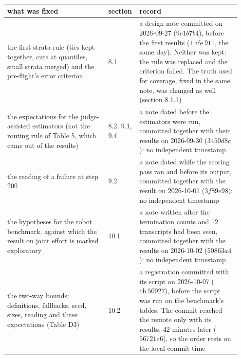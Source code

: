 \documentclass[11pt]{article}
\begin{document}
\begingroup\footnotesize\setlength{\tabcolsep}{4pt}
\begin{longtable}{@{}>{\raggedright\arraybackslash}p{0.428\linewidth}>{\raggedright\arraybackslash}p{0.091\linewidth}>{\raggedright\arraybackslash}p{0.428\linewidth}@{}}
\toprule
\textbf{\hspace{0pt}what was fixed} & \textbf{\hspace{0pt}section} & \textbf{\hspace{0pt}record} \\
\midrule
\endhead
\bottomrule
\endlastfoot
\hspace{0pt}the first strata rule (ties kept together, cuts at quantiles, small strata merged) and the pre-flight's error criterion & \hspace{0pt}8.1 & \hspace{0pt}a design note committed on 2026-09-27 ($9e 1b 7b 4$), before the first results ($1\ \text{afe}\ 911$, the same day). Neither was kept: the rule was replaced and the criterion failed. The truth used for coverage, fixed in the same note, was changed as well (section 8.1.1) \\
\hspace{0pt}the expectations for the judge-assisted estimators (not the routing rule of Table 5, which came out of the results) & \hspace{0pt}8.2, 9.1, 9.4 & \hspace{0pt}a note dated before the estimators were run, committed together with their results on 2026-09-30 ($3450d 8c$): no independent timestamp \\
\hspace{0pt}the reading of a failure at step 200 & \hspace{0pt}9.2 & \hspace{0pt}a note dated while the scoring pass ran and before its output, committed together with the result on 2026-10-01 ($3f 89e 98$): no independent timestamp \\
\hspace{0pt}the hypotheses for the robot benchmark, against which the result on joint effort is marked exploratory & \hspace{0pt}10.1 & \hspace{0pt}a note written after the termination counts and 12 transcripts had been seen, committed together with the results on 2026-10-02 ($50863a 4$): no independent timestamp \\
\hspace{0pt}the two-way bounds: definitions, fallbacks, seed, sizes, reading and three expectations (Table D3) & \hspace{0pt}10.2 & \hspace{0pt}a registration committed with its script on 2026-10-07 ($\text{cb}\ 50927$), before the script was run on the benchmark's tables. The commit reached the remote only with its results, 42 minutes later ($56721e 6$), so the order rests on the local commit time \\

\end{longtable}
\end{document}
